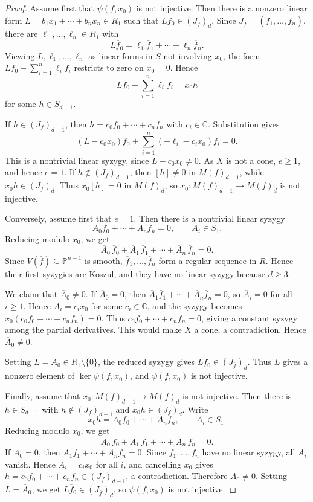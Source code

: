 \documentclass[10pt,a4paper]{amsart}
\newcommand{\C}{\mathbb{C}}
\newcommand{\PP}{\mathbb{P}}
\begin{document}
\begin{proof}
Assume first that $\psi(f,x_0)$ is not injective. Then there is a nonzero
linear form $L=b_1x_1+\cdots+b_nx_n\in R_1$ such that
$L\overline f_0\in (J_{\overline f})_d$. Since
$J_{\overline f}=(\overline f_1,\ldots,\overline f_n)$, there are
$\ell_1,\ldots,\ell_n\in R_1$ with
\[
L\overline f_0=\ell_1\overline f_1+\cdots+\ell_n\overline f_n.
\]
Viewing $L,\ell_1,\ldots,\ell_n$ as linear forms in $S$ not involving $x_0$,
the form $Lf_0-\sum_{i=1}^n\ell_if_i$ restricts to zero on $x_0=0$. Hence
\[
Lf_0-\sum_{i=1}^n\ell_if_i=x_0h
\]
for some $h\in S_{d-1}$.

If $h\in (J_f)_{d-1}$, then $h=c_0f_0+\cdots+c_nf_n$ with $c_i\in\C$.
Substitution gives
\[
(L-c_0x_0)f_0+\sum_{i=1}^n(-\ell_i-c_ix_0)f_i=0.
\]
This is a nontrivial linear syzygy, since $L-c_0x_0\neq0$. As $X$ is not a
cone, $e\geq1$, and hence $e=1$. If $h\notin (J_f)_{d-1}$, then
$[h]\neq0$ in $M(f)_{d-1}$, while $x_0h\in (J_f)_d$. Thus $x_0[h]=0$ in
$M(f)_d$, so $x_0:M(f)_{d-1}\to M(f)_d$ is not injective.

Conversely, assume first that $e=1$. Then there is a nontrivial linear syzygy
\[
A_0f_0+\cdots+A_nf_n=0,\qquad A_i\in S_1.
\]
Reducing modulo $x_0$, we get
\[
\overline A_0\,\overline f_0+
\overline A_1\,\overline f_1+\cdots+\overline A_n\,\overline f_n=0.
\]
Since $V(\overline f)\subseteq\PP^{n-1}$ is smooth,
$\overline f_1,\ldots,\overline f_n$ form a regular sequence in $R$. Hence their
first syzygies are Koszul, and they have no linear syzygy because $d\geq3$.

We claim that $\overline A_0\neq0$. If $\overline A_0=0$, then
$\overline A_1\overline f_1+\cdots+\overline A_n\overline f_n=0$, so
$\overline A_i=0$ for all $i\geq1$. Hence $A_i=c_ix_0$ for some $c_i\in\C$,
and the syzygy becomes $x_0(c_0f_0+\cdots+c_nf_n)=0$. Thus
$c_0f_0+\cdots+c_nf_n=0$, giving a constant syzygy among the partial
derivatives. This would make $X$ a cone, a contradiction. Hence
$\overline A_0\neq0$.

Setting $L=\overline A_0\in R_1\setminus\{0\}$, the reduced syzygy gives
$L\overline f_0\in (J_{\overline f})_d$. Thus $L$ gives a nonzero element of
$\ker\psi(f,x_0)$, and $\psi(f,x_0)$ is not injective.

Finally, assume that $x_0:M(f)_{d-1}\to M(f)_d$ is not injective. Then there is
$h\in S_{d-1}$ with $h\notin (J_f)_{d-1}$ and $x_0h\in (J_f)_d$. Write
\[
x_0h=A_0f_0+\cdots+A_nf_n,\qquad A_i\in S_1.
\]
Reducing modulo $x_0$, we get
\[
\overline A_0\,\overline f_0+
\overline A_1\,\overline f_1+\cdots+\overline A_n\,\overline f_n=0.
\]
If $\overline A_0=0$, then
$\overline A_1\overline f_1+\cdots+\overline A_n\overline f_n=0$. Since
$\overline f_1,\ldots,\overline f_n$ have no linear syzygy, all
$\overline A_i$ vanish. Hence $A_i=c_ix_0$ for all $i$, and cancelling $x_0$
gives $h=c_0f_0+\cdots+c_nf_n\in (J_f)_{d-1}$, a contradiction. Therefore
$\overline A_0\neq0$. Setting $L=\overline A_0$, we get
$L\overline f_0\in (J_{\overline f})_d$, so $\psi(f,x_0)$ is not injective.
\end{proof}
\end{document}
